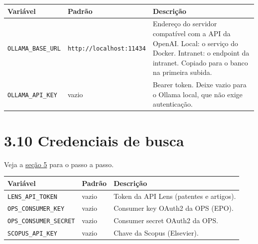 \documentclass[
  brazilian,
  a4paper,12pt,oneside]{report}
\newcounter{none} %
\begin{document}
{\def\LTcaptype{none} %
\begin{longtable}[]{@{}
  >{\raggedright\arraybackslash}p{}
  >{\raggedright\arraybackslash}p{}
  >{\raggedright\arraybackslash}p{}@{}}
\toprule\noalign{}
\begin{minipage}[b]{\linewidth}\raggedright
Variável
\end{minipage} & \begin{minipage}[b]{\linewidth}\raggedright
Padrão
\end{minipage} & \begin{minipage}[b]{\linewidth}\raggedright
Descrição
\end{minipage} \\
\midrule\noalign{}
\endhead
\bottomrule\noalign{}
\endlastfoot
\texttt{OLLAMA\_}\allowbreak{}\texttt{BASE\_}\allowbreak{}\texttt{URL} &
\texttt{http:}\allowbreak{}\texttt{/}\allowbreak{}\texttt{/}\allowbreak{}\texttt{localhost:}\allowbreak{}\texttt{11434}
& Endereço do servidor compatível com a API da OpenAI. Local: o serviço
do Docker. Intranet: o endpoint da intranet. Copiado para o banco na
primeira subida. \\
\texttt{OLLAMA\_}\allowbreak{}\texttt{API\_}\allowbreak{}\texttt{KEY} &
vazio & Bearer token. Deixe vazio para o Ollama local, que não exige
autenticação. \\
\end{longtable}
}

\section{3.10 Credenciais de busca}\label{credenciais-de-busca}

Veja a \hyperref[5-apis-de-busca]{seção 5} para o passo a passo.

{\def\LTcaptype{none} %
\begin{longtable}[]{@{}lll@{}}
\toprule\noalign{}
Variável & Padrão & Descrição \\
\midrule\noalign{}
\endhead
\bottomrule\noalign{}
\endlastfoot
\texttt{LENS\_}\allowbreak{}\texttt{API\_}\allowbreak{}\texttt{TOKEN} &
vazio & Token da API Lens (patentes e artigos). \\
\texttt{OPS\_}\allowbreak{}\texttt{CONSUMER\_}\allowbreak{}\texttt{KEY}
& vazio & Consumer key OAuth2 da OPS (EPO). \\
\texttt{OPS\_}\allowbreak{}\texttt{CONSUMER\_}\allowbreak{}\texttt{SECRET}
& vazio & Consumer secret OAuth2 da OPS. \\
\texttt{SCOPUS\_}\allowbreak{}\texttt{API\_}\allowbreak{}\texttt{KEY} &
vazio & Chave da Scopus (Elsevier). \\
\end{longtable}
}
\end{document}
